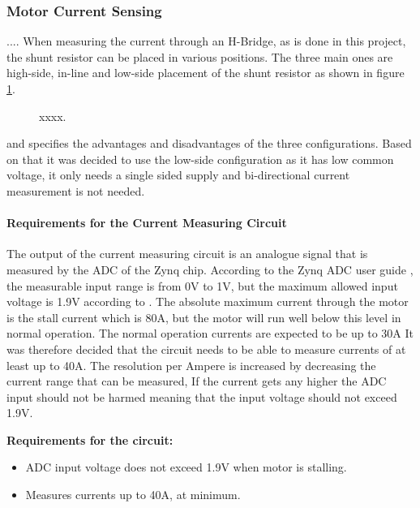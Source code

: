 \subsubsection{Motor Current Sensing}
....
When measuring the current through an H-Bridge, as is done in this project, the shunt resistor can be placed in various positions.
The three main ones are high-side, in-line and low-side placement of the shunt resistor as shown in figure \ref{fig:shunt_measure_high_in_low}.

\begin{figure}[h]
	\centering
	\caption{xxxx.}
	\label{fig:shunt_measure_high_in_low}
\end{figure}

\cite{shunt_placement} and \cite{Current_Sense_Circuit_Collection} specifies the advantages and disadvantages of the three configurations.
Based on that it was decided to use the low-side configuration as it has low common voltage, it only needs a single sided supply and bi-directional current measurement is not needed.


\paragraph{Requirements for the Current Measuring Circuit} %
\label{par:requirements_for_the_current_measuring_circuit}

The output of the current measuring circuit is an analogue signal that is measured by the ADC of the Zynq chip.
According to the Zynq ADC user guide \cite{zynq_adc}, the measurable input range is from 0V to 1V, but the maximum allowed input voltage is 1.9V according to \cite{adc_zynq_webanswer}.
The absolute maximum current through the motor is the stall current which is 80A, but the motor will run well below this level in normal operation.
The normal operation currents are expected to be up to 30A
It was therefore decided that the circuit  needs to be able to measure currents of at least up to 40A.
The resolution per Ampere is increased by decreasing the current range that can be measured,
If the current gets any higher the ADC input should not be harmed meaning that the input voltage should not exceed 1.9V.

\textbf{Requirements for the circuit:}
\begin{itemize}
	\item ADC input voltage does not exceed 1.9V when motor is stalling.
	\item Measures currents up to 40A, at minimum.
\end{itemize}

